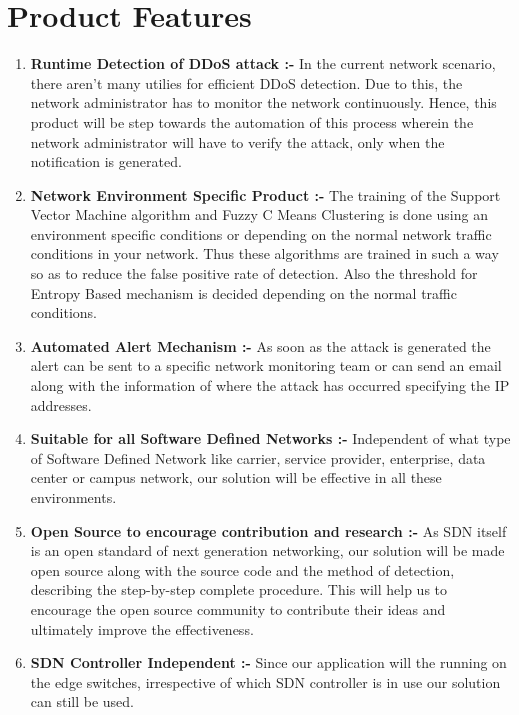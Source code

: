\documentclass[12pt,a4paper,final]{report}
\begin{document}
\section{Product Features}
\begin{enumerate}
\item
\textbf{Runtime Detection of DDoS attack :-}
\newline
In the current network scenario, there aren't many utilies for efficient DDoS detection. Due to this, the network administrator has to monitor the network continuously. Hence, this product will be step towards the automation of this process wherein the network administrator will have to verify the attack, only when the notification is generated.

\item
\textbf{Network Environment Specific Product :-}
\newline
The training of the Support Vector Machine algorithm and Fuzzy C Means Clustering is done using an environment specific conditions or depending on the normal network traffic conditions in your network. Thus these algorithms are trained in such a way so as to reduce the false positive rate of detection. Also the threshold for Entropy Based mechanism is decided depending on the normal traffic conditions.

\item
\textbf{Automated Alert Mechanism :-}
\newline
As soon as the attack is generated the alert can be sent to a specific network monitoring team or can send an email along with the information of where the attack has occurred specifying the IP addresses.

\item
\textbf{Suitable for all Software Defined Networks :-}
\newline
Independent of what type of Software Defined Network like carrier, service provider, enterprise, data center or campus network, our solution will be effective in all these environments.

\item
\textbf{Open Source to encourage contribution and research :-}
\newline
As SDN itself is an open standard of next generation networking, our solution will be made open source along with the source code and the method of detection, describing the step-by-step complete procedure. This will help us to encourage the open source community to contribute their ideas and ultimately improve the effectiveness.

\item
\textbf{SDN Controller Independent :-}
\newline
Since our application will the running on the edge switches, irrespective of which SDN controller is in use our solution can still be used.
\end{enumerate}
\end{document}
